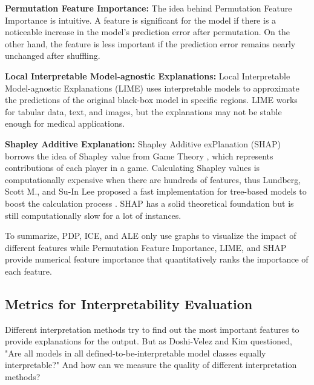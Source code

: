 
\textbf{Permutation Feature Importance: } The idea behind Permutation Feature Importance is intuitive. A feature is significant for the model if there is a noticeable increase in the model's prediction error after permutation. On the other hand, the feature is less important if the prediction error remains nearly unchanged after shuffling.

\textbf{Local Interpretable Model-agnostic Explanations:} Local Interpretable Model-agnostic Explanations (LIME) uses interpretable models to approximate the predictions of the original black-box model in specific regions. LIME works for tabular data, text, and images, but the explanations may not be stable enough for medical applications.

\textbf{Shapley Additive Explanation: } Shapley Additive exPlanation (SHAP) borrows the idea of Shapley value from Game Theory \citep{shapley_1953}, which represents contributions of each player in a game. Calculating Shapley values is computationally expensive when there are hundreds of features, thus Lundberg, Scott M., and Su-In Lee proposed a fast implementation for tree-based models to boost the calculation process \citep{lundberg2017unified}. SHAP has a solid theoretical foundation but is still computationally slow for a lot of instances.

To summarize, PDP, ICE, and ALE only use graphs to visualize the impact of different features while Permutation Feature Importance, LIME, and SHAP provide numerical feature importance that quantitatively ranks the importance of each feature.


\subsection{Metrics for Interpretability Evaluation}

Different interpretation methods try to find out the most important features to provide explanations for the output. But as Doshi-Velez and Kim questioned, "Are all models in all defined-to-be-interpretable model classes equally interpretable?"  \citep{doshivelez2017rigorous} And how can we measure the quality of different interpretation methods? 

